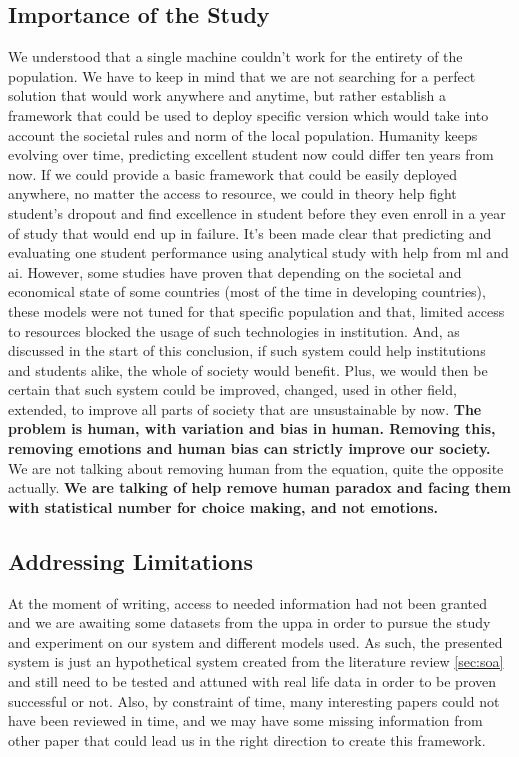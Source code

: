 \documentclass[../main.tex]{subfiles}
\begin{document}
\subsection{Importance of the Study}
We understood that a single machine couldn't work for the entirety of the population. We have to keep in mind that we are not searching for a perfect solution that would work anywhere and anytime, but rather establish a framework that could be used to deploy specific version which would take into account the societal rules and norm of the local population. Humanity keeps evolving over time, predicting excellent student now could differ ten years from now. 
If we could provide a basic framework that could be easily deployed anywhere, no matter the access to resource, we could in theory help fight student's dropout and find excellence in student before they even enroll in a year of study that would end up in failure.
It's been made clear that predicting and evaluating one student performance using analytical study with help from \acrshort{ml} and \acrshort{ai}. However, some studies have proven that depending on the societal and economical state of some countries (most of the time in developing countries), these models were not tuned for that specific population and that, limited access to resources blocked the usage of such technologies in institution.
And, as discussed in the start of this conclusion, if such system could help institutions and students alike, the whole of society would benefit. Plus, we would then be certain that such system could be improved, changed, used in other field, extended, to improve all parts of society that are unsustainable by now.
\textbf{The problem is human, with variation and bias in human. Removing this, removing emotions and human bias can strictly improve our society.} We are not talking about removing human from the equation, quite the opposite actually. \textbf{We are talking of help remove human paradox and facing them with statistical number for choice making, and not emotions.}

\subsection{Addressing Limitations}
At the moment of writing, access to needed information had not been granted and we are awaiting some datasets from the \acrfull{uppa} in order to pursue the study and experiment on our system and different models used. 
As such, the presented system is just an hypothetical system created from the literature review \ref{sec:soa} and still need to be tested and attuned with real life data in order to be proven successful or not.
Also, by constraint of time, many interesting papers could not have been reviewed in time, and we may have some missing information from other paper that could lead us in the right direction to create this framework.
\end{document}

